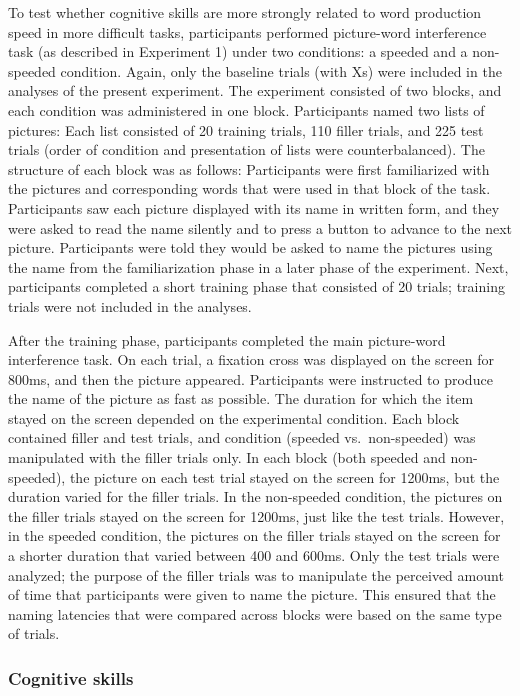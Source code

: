 \documentclass[
  man,floatsintext]{apa6}
\begin{document}
To test whether cognitive skills are more strongly related to word production speed in more difficult tasks, participants performed picture-word interference task (as described in Experiment 1) under two conditions: a speeded and a non-speeded condition. Again, only the baseline trials (with Xs) were included in the analyses of the present experiment. The experiment consisted of two blocks, and each condition was administered in one block. Participants named two lists of pictures: Each list consisted of 20 training trials, 110 filler trials, and 225 test trials (order of condition and presentation of lists were counterbalanced). The structure of each block was as follows: Participants were first familiarized with the pictures and corresponding words that were used in that block of the task. Participants saw each picture displayed with its name in written form, and they were asked to read the name silently and to press a button to advance to the next picture. Participants were told they would be asked to name the pictures using the name from the familiarization phase in a later phase of the experiment. Next, participants completed a short training phase that consisted of 20 trials; training trials were not included in the analyses.

After the training phase, participants completed the main picture-word interference task. On each trial, a fixation cross was displayed on the screen for 800ms, and then the picture appeared. Participants were instructed to produce the name of the picture as fast as possible. The duration for which the item stayed on the screen depended on the experimental condition. Each block contained filler and test trials, and condition (speeded vs.~non-speeded) was manipulated with the filler trials only. In each block (both speeded and non-speeded), the picture on each test trial stayed on the screen for 1200ms, but the duration varied for the filler trials. In the non-speeded condition, the pictures on the filler trials stayed on the screen for 1200ms, just like the test trials. However, in the speeded condition, the pictures on the filler trials stayed on the screen for a shorter duration that varied between 400 and 600ms. Only the test trials were analyzed; the purpose of the filler trials was to manipulate the perceived amount of time that participants were given to name the picture. This ensured that the naming latencies that were compared across blocks were based on the same type of trials.

\hypertarget{cognitive-skills-1}{%
\subsubsection{Cognitive skills}\label{cognitive-skills-1}}
\end{document}

